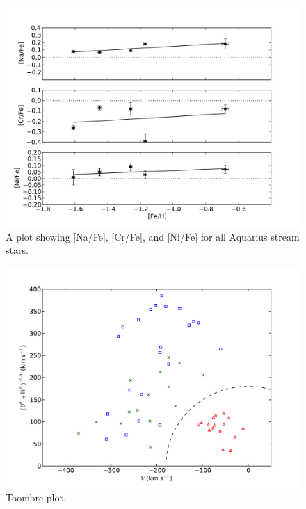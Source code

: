 \documentclass{emulateapj}
\begin{document}
\begin{figure}[h]
	\includegraphics[width=\columnwidth]{./figures/aquarius-na-cr-ni-fe.pdf}
	\caption{A plot showing [Na/Fe], [Cr/Fe], and [Ni/Fe] for all Aquarius stream stars.}
	\label{fig:na-cr-ni-fe}
\end{figure}




\begin{figure}[h]
	\includegraphics[width=\columnwidth]{./figures/plot-toombre.pdf}
	\caption{Toombre plot.}
	\label{fig:toombre}
\end{figure}





\end{document}
